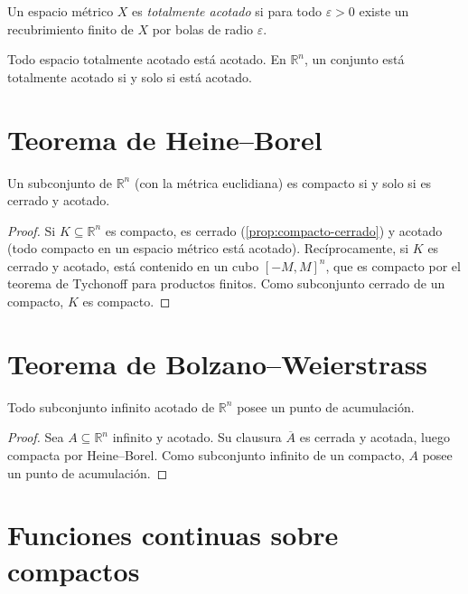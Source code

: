 \begin{definition}
\label{def:totalmente-acotado}
Un espacio métrico $X$ es \emph{totalmente acotado} si para todo $\varepsilon>0$ existe un recubrimiento finito de $X$ por bolas de radio $\varepsilon$.
\end{definition}

\begin{proposition}
\label{prop:totalmente-acotado-acotado}
Todo espacio totalmente acotado está acotado. En $\mathbb{R}^n$, un conjunto está totalmente acotado si y solo si está acotado.
\end{proposition}

\section{Teorema de Heine--Borel}

\begin{theorem}
\label{teo:heine-borel}
Un subconjunto de $\mathbb{R}^n$ (con la métrica euclidiana) es compacto si y solo si es cerrado y acotado.
\end{theorem}
\begin{proof}
Si $K\subseteq\mathbb{R}^n$ es compacto, es cerrado (\cref{prop:compacto-cerrado}) y acotado (todo compacto en un espacio métrico está acotado). Recíprocamente, si $K$ es cerrado y acotado, está contenido en un cubo $[-M,M]^n$, que es compacto por el teorema de Tychonoff para productos finitos. Como subconjunto cerrado de un compacto, $K$ es compacto.
\end{proof}

\section{Teorema de Bolzano--Weierstrass}

\begin{theorem}
\label{teo:bw-compacidad}
Todo subconjunto infinito acotado de $\mathbb{R}^n$ posee un punto de acumulación.
\end{theorem}
\begin{proof}
Sea $A\subseteq\mathbb{R}^n$ infinito y acotado. Su clausura $\overline{A}$ es cerrada y acotada, luego compacta por Heine--Borel. Como subconjunto infinito de un compacto, $A$ posee un punto de acumulación.
\end{proof}

\section{Funciones continuas sobre compactos}

